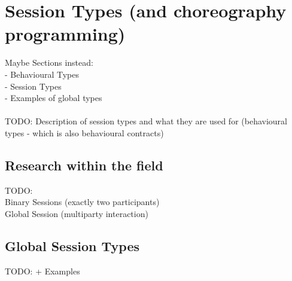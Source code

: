 \section{Session Types (and choreography programming)}
Maybe Sections instead: \\
 - Behavioural Types \\
 - Session Types \\
 - Examples of global types \\ \\
TODO: Description of session types and what they are used for (behavioural types - which is also behavioural contracts)

\subsection{Research within the field}
TODO: \\
Binary Sessions (exactly two participants) \\
Global Session (multiparty interaction)

\subsection{Global Session Types}
TODO:  + Examples